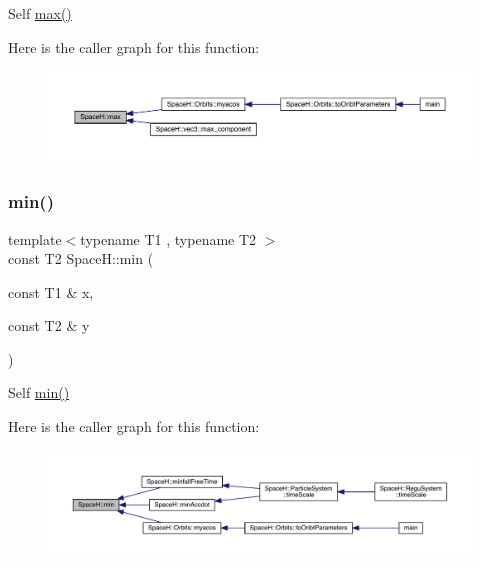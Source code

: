Self \mbox{\hyperlink{namespace_space_h_aacd80a06ba9a8b2381301a3917d79cbe}{max()}} 

Here is the caller graph for this function\+:
\nopagebreak
\begin{figure}[H]
\begin{center}
\leavevmode
\includegraphics[width=350pt]{namespace_space_h_aacd80a06ba9a8b2381301a3917d79cbe_icgraph}
\end{center}
\end{figure}
\mbox{\label{namespace_space_h_a2fac2c0f208348efc355314a88754b4a}} 
\subsubsection{\texorpdfstring{min()}{min()}}
{\footnotesize\ttfamily template$<$typename T1 , typename T2 $>$ \\
const T2 Space\+H\+::min (\begin{DoxyParamCaption}\item[{const T1 \&}]{x,  }\item[{const T2 \&}]{y }\end{DoxyParamCaption})\hspace{0.3cm}{\ttfamily [inline]}}



Self \mbox{\hyperlink{namespace_space_h_a2fac2c0f208348efc355314a88754b4a}{min()}} 

Here is the caller graph for this function\+:
\nopagebreak
\begin{figure}[H]
\begin{center}
\leavevmode
\includegraphics[width=350pt]{namespace_space_h_a2fac2c0f208348efc355314a88754b4a_icgraph}
\end{center}
\end{figure}
\mbox{\label{namespace_space_h_aba7eeef1dd99d282a7653b187f2b9f9f}} 

